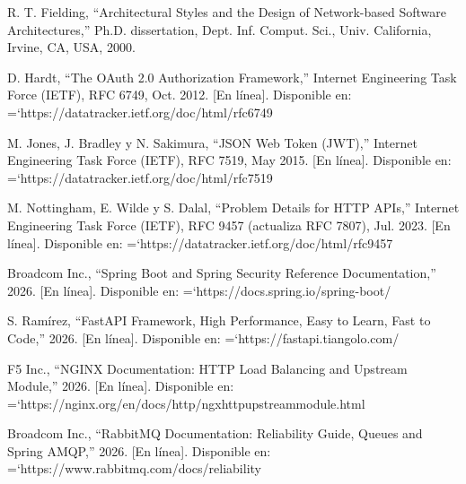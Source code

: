 \documentclass[11pt,a4paper]{article}
\renewcommand{\_}{\oldunderscore\allowbreak}
\DeclareRobustCommand{\texttt}[1]{%
  {\upshape\ttfamily\fontsize{9}{10.8}\selectfont\hyphenchar\font=`\-\relax #1}%
}
\begin{document}
\begin{enumerate}[label={[\arabic*]},leftmargin=*,itemsep=3pt,topsep=2pt]
  \item R. T. Fielding, ``Architectural Styles and the Design of Network-based Software Architectures,'' Ph.D. dissertation, Dept. Inf. Comput. Sci., Univ. California, Irvine, CA, USA, 2000.
  \item D. Hardt, ``The OAuth 2.0 Authorization Framework,'' Internet Engineering Task Force (IETF), RFC 6749, Oct. 2012. [En línea]. Disponible en: \texttt{https:\allowbreak{}/\allowbreak{}/\allowbreak{}datatracker.\allowbreak{}ietf.\allowbreak{}org/\allowbreak{}doc/\allowbreak{}html/\allowbreak{}rfc6749}
  \item M. Jones, J. Bradley y N. Sakimura, ``JSON Web Token (JWT),'' Internet Engineering Task Force (IETF), RFC 7519, May 2015. [En línea]. Disponible en: \texttt{https:\allowbreak{}/\allowbreak{}/\allowbreak{}datatracker.\allowbreak{}ietf.\allowbreak{}org/\allowbreak{}doc/\allowbreak{}html/\allowbreak{}rfc7519}
  \item M. Nottingham, E. Wilde y S. Dalal, ``Problem Details for HTTP APIs,'' Internet Engineering Task Force (IETF), RFC 9457 (actualiza RFC 7807), Jul. 2023. [En línea]. Disponible en: \texttt{https:\allowbreak{}/\allowbreak{}/\allowbreak{}datatracker.\allowbreak{}ietf.\allowbreak{}org/\allowbreak{}doc/\allowbreak{}html/\allowbreak{}rfc9457}
  \item Broadcom Inc., ``Spring Boot and Spring Security Reference Documentation,'' 2026. [En línea]. Disponible en: \texttt{https:\allowbreak{}/\allowbreak{}/\allowbreak{}docs.\allowbreak{}spring.\allowbreak{}io/\allowbreak{}spring-boot/}
  \item S. Ramírez, ``FastAPI Framework, High Performance, Easy to Learn, Fast to Code,'' 2026. [En línea]. Disponible en: \texttt{https:\allowbreak{}/\allowbreak{}/\allowbreak{}fastapi.\allowbreak{}tiangolo.\allowbreak{}com/}
  \item F5 Inc., ``NGINX Documentation: HTTP Load Balancing and Upstream Module,'' 2026. [En línea]. Disponible en: \texttt{https:\allowbreak{}/\allowbreak{}/\allowbreak{}nginx.\allowbreak{}org/\allowbreak{}en/\allowbreak{}docs/\allowbreak{}http/\allowbreak{}ngx\_http\_upstream\_module.\allowbreak{}html}
  \item Broadcom Inc., ``RabbitMQ Documentation: Reliability Guide, Queues and Spring AMQP,'' 2026. [En línea]. Disponible en: \texttt{https:\allowbreak{}/\allowbreak{}/\allowbreak{}www.\allowbreak{}rabbitmq.\allowbreak{}com/\allowbreak{}docs/\allowbreak{}reliability}

\end{enumerate}
\end{document}
